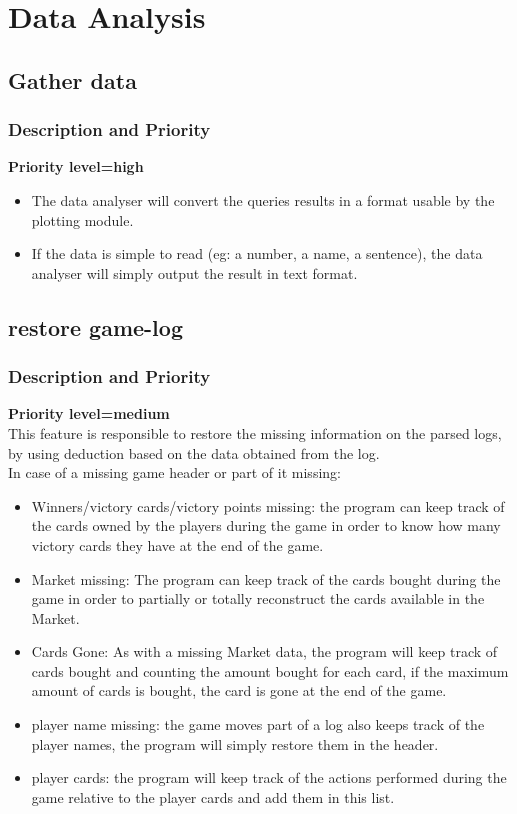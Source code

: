 \documentclass{scrreprt}
\begin{document}
\section{Data Analysis}


\subsection{Gather data}
\subsubsection{Description and Priority}
\textbf{Priority level=high}\\
\begin{itemize}
\item The data analyser will convert the queries results in a format usable by the plotting module.
\item If the data is simple to read (eg: a number, a name, a sentence), the data analyser will simply output the result in text format.
  \end{itemize}

\subsection{restore game-log}
\subsubsection{Description and Priority}
\textbf{Priority level=medium}\\
This feature is responsible to restore the missing information on the parsed
logs, by using deduction based on the data obtained from the log.\\
In case of a missing game header or part of it missing:
  \begin{itemize}
  \item Winners/victory cards/victory points missing: the program can keep track of the cards owned by the players during the game in order to know how many victory cards they have at the end of the game.
  \item Market missing: The program can keep track of the cards bought during the game in order to partially or totally reconstruct the cards available in the Market.
  \item Cards Gone: As with a missing Market data, the program will keep track of cards bought and counting the amount bought for each card, if the maximum amount of cards is bought, the card is gone at the end of the game.
  \item player name missing: the game moves part of a log also keeps track of the player names, the program will simply restore them in the header.
  \item player cards: the program will keep track of the actions performed during the game relative to the player cards and add them in this list.
  \end{itemize}
\end{document}
